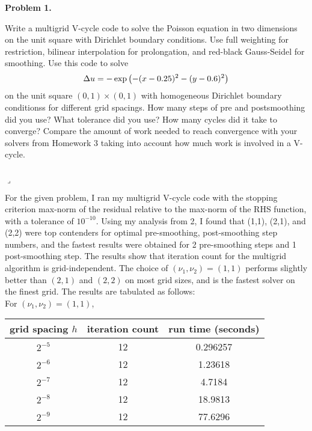 \documentclass[12pt]{article}
\newenvironment{myprob}[1]
    {%
    \noindent{\Huge$\ulcorner$}\textbf{#1.}\begin{em}
    }
    { 
    \end{em} \\ \hphantom{l} \hfill {\Huge$\lrcorner$} }
\begin{document}
\rhead{\today}

{\let\newpage\relax} 


\begin{myprob}{Problem 1}
Write a multigrid V-cycle code to solve the Poisson equation in two dimensions on the unit square with Dirichlet boundary conditions. Use full weighting for restriction, bilinear interpolation for prolongation, and red-black Gauss-Seidel for smoothing.
Use this code to solve
$$\Delta u = -\exp\qty( - (x-0.25)^2 - (y-0.6)^2)$$
on the unit square $(0, 1) \times (0, 1)$ with homogeneous Dirichlet boundary conditionss for different grid spacings. How many steps of pre and postsmoothing did you use? What tolerance did you use? How many cycles did it take to converge? Compare the amount of work needed to reach convergence with your solvers from Homework 3 taking into account how much work is involved in a V-cycle.
\end{myprob}

For the given problem, I ran my multigrid V-cycle code with the stopping criterion
max-norm of the residual relative to the max-norm of the RHS function, with a tolerance of $10^{-10}$. Using my analysis from 2, I found that (1,1), (2,1), and (2,2) were top contenders for optimal pre-smoothing, post-smoothing step numbers, and the fastest results were obtained for 2 pre-smoothing steps and 1 post-smoothing step. The results show that iteration count for the multigrid algorithm is grid-independent. The choice of $(\nu_1, \nu_2) = (1,1)$ performs slightly better than $(2,1)$ and $(2,2)$ on most grid sizes, and is the fastest solver on the finest grid. The results are tabulated as follows: \\
For $(\nu_1, \nu_2) = (1,1)$,  \\
\begin{center}
\begin{tabular}{||c|c|c||}
\hline \hline
   grid spacing $h$ &   iteration count &   run time (seconds) \\
\hline \hline
       $2^{-5}$    &  12 &  0.296257 \\
       $2^{-6}$   &   12 &  1.23618    \\
       $2^{-7}$  &  12 &  4.7184  \\
       $2^{-8}$ &  12 & 18.9813   \\
       $2^{-9}$ & 12 & 77.6296 \\
\hline \hline
\end{tabular}
\end{center}
\end{document}
